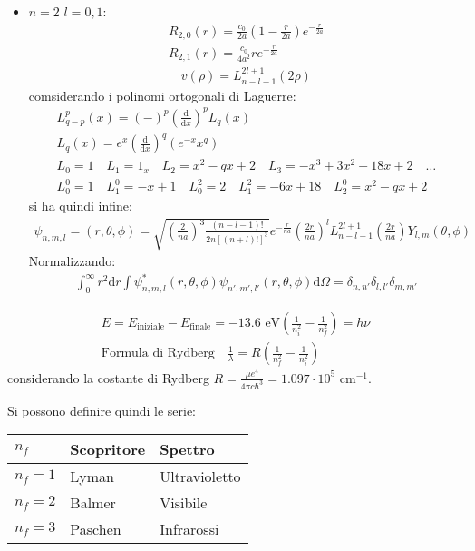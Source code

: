 \begin{itemize}
\item $n=2$ $l=0,1$:
\begin{equation}\begin{split}
R_{2,0}\left(r\right)=\frac{c_0}{2a}\left(1-\frac{r}{2a}\right)e^{-\frac{r}{2a}} \\
R_{2,1}\left(r\right)=\frac{c_0}{4a^2}re^{-\frac{r}{2a}}
\end{split}\end{equation}
\begin{equation}\begin{split}
v\left(\rho\right)=L_{n-l-1}^{2l+1}\left(2\rho\right)
\end{split}\end{equation}
comsiderando i polinomi ortogonali di Laguerre:
\begin{equation}\begin{split}
L_{q-p}^{p}\left(x\right)=\left(-\right)^p\left(\frac{\textrm{d}}{\textrm{d}x}\right)^pL_q\left(x\right) \\
L_q\left(x\right)=e^x\left(\frac{\textrm{d}}{\textrm{d}x}\right)^q\left(e^{-x}x^q\right) \\
L_0=1 \quad L_1=1_x \quad L_2=x^2-qx+2 \quad L_3=-x^3+3x^2-18x+2 \quad \dots \\
L_0^0=1 \quad L_1^0=-x+1 \quad L_0^2=2 \quad L_1^2=-6x+18 \quad L_2^0=x^2-qx+2
\end{split}\end{equation}
si ha quindi infine:
\begin{equation}\begin{split}
\psi _{n,m,l}=\left(r,\theta,\phi\right)=\sqrt{\left(\frac{2}{na}\right)^3\frac{\left(n-l-1\right)!}{2n\left[\left(n+l\right)!\right]^3}}e^{-\frac{r}{na}}\left(\frac{2r}{na}\right)^lL_{n-l-1}^{2l+1}\left(\frac{2r}{na}\right)Y_{l,m}\left(\theta,\phi\right)
\end{split}\end{equation}
Normalizzando:
\begin{equation}\begin{split}
\int_{0}^{\infty }{r^2 \textrm{d}r}\int{\psi ^*_{n,m,l}\left(r,\theta,\phi\right)\psi _{n',m',l'}\left(r,\theta,\phi\right) \textrm{d}\Omega}=\delta_{n,n'}\delta_{l,l'}\delta_{m,m'}
\end{split}\end{equation}
\end{itemize}

\begin{equation}\begin{split}
E=E_{\textrm{iniziale}}-E_{\textrm{finale}}=-13.6 \textrm{ eV} \left(\frac{1}{n_i^2}-\frac{1}{n_f^2}\right)=h\nu \\
\textrm{Formula di Rydberg}\quad \frac{1}{\lambda}=R\left(\frac{1}{n_f^2}-\frac{1}{n_i^2}\right)
\end{split}\end{equation}
considerando la costante di Rydberg $R=\frac{\mu e^4}{4\pi c\hbar ^3}=1.097\cdot 10^5$ cm$^{-1}$.

Si possono definire quindi le serie: \\
\begin{tabularx}{\textwidth}{XXX}
\toprule
$n_f$ & Scopritore & Spettro \\
\midrule
$n_f=1$ & Lyman & Ultravioletto \\
$n_f=2$ & Balmer & Visibile \\
$n_f=3$ & Paschen & Infrarossi \\
\bottomrule
\end{tabularx}